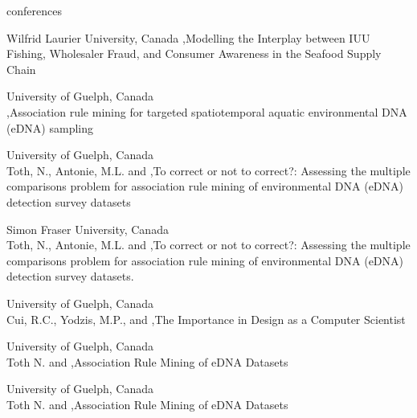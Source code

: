 \medskip
\begin{revlist}{conferences}
\item {}
  Wilfrid Laurier University, Canada \sep Modelling the Interplay between IUU
  Fishing, Wholesaler Fraud, and Consumer Awareness in the Seafood Supply Chain
\item {}
  University of Guelph, Canada\\
  \me \sep Association rule mining for targeted spatiotemporal aquatic
  environmental DNA (eDNA) sampling
\item {}
  University of Guelph, Canada\\
  \dsup Toth, N., Antonie, M.L. and \me \sep To correct or not to correct?:
  Assessing the multiple comparisons problem for association rule mining of
  environmental DNA (eDNA) detection survey datasets
\item {}
  Simon Fraser University, Canada\\
  \dsup Toth, N., Antonie, M.L. and \me \sep To correct or not to correct?:
  Assessing the multiple comparisons problem for association rule mining of
  environmental DNA (eDNA) detection survey datasets.
\item {}
  University of Guelph, Canada\\
  \dsup Cui, R.C., Yodzis, M.P., and \me \sep The Importance in Design as a Computer Scientist
\item {}
  University of Guelph, Canada\\
  \dsup Toth N. and \me \sep Association Rule Mining of eDNA Datasets
\item {}
  University of Guelph, Canada\\
  \dsup Toth N. and \me \sep Association Rule Mining of eDNA Datasets
\item {}

\end{revlist}
